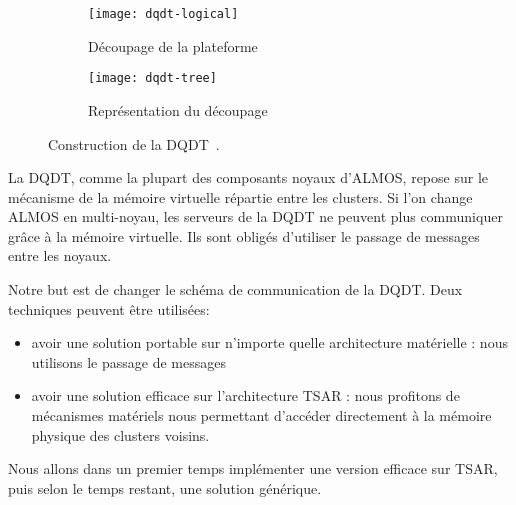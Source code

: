     \begin{figure}[ht]
      \begin{subfigure}[b]{0.5\textwidth}
        \texttt{[image: dqdt-logical]}
        \caption{Découpage de la plateforme}
        \label{fig:dqdt-logical}
      \end{subfigure}
      \begin{subfigure}[b]{0.4\textwidth}
        \texttt{[image: dqdt-tree]}
        \caption{Représentation du découpage}
        \label{fig:dqdt-tree}
      \end{subfigure}
      \caption{Construction de la DQDT~\citep{almaless2014universite}.}
    \end{figure}

    La DQDT, comme la plupart des composants noyaux d'ALMOS, repose sur le
    mécanisme de la mémoire virtuelle répartie entre les clusters. Si l'on
    change ALMOS en multi-noyau, les serveurs de la DQDT ne peuvent plus
    communiquer grâce à la mémoire virtuelle. Ils sont obligés d'utiliser le
    passage de messages entre les noyaux.

    Notre but est de changer le schéma de communication de la DQDT. Deux
    techniques peuvent être utilisées:
    \begin{itemize}
      \item avoir une solution portable sur n'importe quelle architecture
        matérielle : nous utilisons le passage de messages
      \item avoir une solution efficace sur l'architecture TSAR : nous profitons
        de mécanismes matériels nous permettant d'accéder directement à la
        mémoire physique des clusters voisins.
    \end{itemize}

    Nous allons dans un premier temps implémenter une version efficace sur TSAR,
    puis selon le temps restant, une solution générique.


